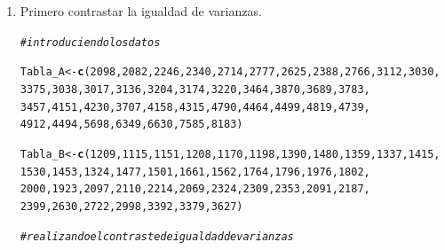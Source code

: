 \documentclass[12pt,letterpaper]{article}\usepackage[]{graphicx}\usepackage[]{color}
\makeatletter
\newcommand{\hlnum}[1]{\textcolor[rgb]{0.686,0.059,0.569}{#1}}%
\newcommand{\hlcom}[1]{\textcolor[rgb]{0.678,0.584,0.686}{\textit{#1}}}%
\newcommand{\hlstd}[1]{\textcolor[rgb]{0.345,0.345,0.345}{#1}}%
\newcommand{\hlkwb}[1]{\textcolor[rgb]{0.69,0.353,0.396}{#1}}%
\newcommand{\hlkwd}[1]{\textcolor[rgb]{0.737,0.353,0.396}{\textbf{#1}}}%
\newenvironment{kframe}{%
 \def\at@end@of@kframe{}%
 \ifinner\ifhmode%
  \def\at@end@of@kframe{\end{minipage}}%
  \begin{minipage}{\columnwidth}%
 \fi\fi%
 \def\FrameCommand##1{\hskip\@totalleftmargin \hskip-\fboxsep
 \colorbox{shadecolor}{##1}\hskip-\fboxsep
     \hskip-\linewidth \hskip-\@totalleftmargin \hskip\columnwidth}%
 \MakeFramed {\advance\hsize-\width
   \@totalleftmargin\z@ \linewidth\hsize
   \@setminipage}}%
 {\par\unskip\endMakeFramed%
 \at@end@of@kframe}
\newenvironment{knitrout}{}{} %
\makeatother
\begin{document}
\begin{enumerate}
  \item Primero contrastar la igualdad de varianzas.

\begin{knitrout}
\color{fgcolor}\begin{kframe}
\begin{alltt}
\hlcom{# introduciendo los datos }

\hlstd{Tabla_A} \hlkwb{<-} \hlkwd{c}\hlstd{(}\hlnum{2098}\hlstd{,} \hlnum{2082}\hlstd{,} \hlnum{2246}\hlstd{,} \hlnum{2340}\hlstd{,} \hlnum{2714}\hlstd{,} \hlnum{2777}\hlstd{,} \hlnum{2625}\hlstd{,} \hlnum{2388}\hlstd{,} \hlnum{2766}\hlstd{,} \hlnum{3112}\hlstd{,} \hlnum{3030}\hlstd{,}
             \hlnum{3375}\hlstd{,} \hlnum{3038}\hlstd{,} \hlnum{3017}\hlstd{,} \hlnum{3136}\hlstd{,} \hlnum{3204}\hlstd{,} \hlnum{3174}\hlstd{,} \hlnum{3220}\hlstd{,} \hlnum{3464}\hlstd{,} \hlnum{3870}\hlstd{,} \hlnum{3689}\hlstd{,} \hlnum{3783}\hlstd{,}
             \hlnum{3457}\hlstd{,} \hlnum{4151}\hlstd{,} \hlnum{4230}\hlstd{,} \hlnum{3707}\hlstd{,} \hlnum{4158}\hlstd{,} \hlnum{4315}\hlstd{,} \hlnum{4790}\hlstd{,} \hlnum{4464}\hlstd{,} \hlnum{4499}\hlstd{,} \hlnum{4819}\hlstd{,} \hlnum{4739}\hlstd{,}
             \hlnum{4912}\hlstd{,} \hlnum{4494}\hlstd{,} \hlnum{5698}\hlstd{,} \hlnum{6349}\hlstd{,} \hlnum{6630}\hlstd{,} \hlnum{7585}\hlstd{,}\hlnum{8183}\hlstd{)}

\hlstd{Tabla_B}\hlkwb{<-} \hlkwd{c}\hlstd{(}\hlnum{1209}\hlstd{,} \hlnum{1115}\hlstd{,} \hlnum{1151}\hlstd{,} \hlnum{1208}\hlstd{,} \hlnum{1170}\hlstd{,} \hlnum{1198}\hlstd{,} \hlnum{1390}\hlstd{,} \hlnum{1480}\hlstd{,} \hlnum{1359}\hlstd{,} \hlnum{1337}\hlstd{,} \hlnum{1415}\hlstd{,}
            \hlnum{1530}\hlstd{,} \hlnum{1453}\hlstd{,} \hlnum{1324}\hlstd{,} \hlnum{1477}\hlstd{,} \hlnum{1501}\hlstd{,} \hlnum{1661}\hlstd{,} \hlnum{1562}\hlstd{,} \hlnum{1764}\hlstd{,} \hlnum{1796}\hlstd{,} \hlnum{1976}\hlstd{,} \hlnum{1802}\hlstd{,}
            \hlnum{2000}\hlstd{,} \hlnum{1923}\hlstd{,} \hlnum{2097}\hlstd{,} \hlnum{2110}\hlstd{,} \hlnum{2214}\hlstd{,} \hlnum{2069}\hlstd{,} \hlnum{2324}\hlstd{,} \hlnum{2309}\hlstd{,} \hlnum{2353}\hlstd{,} \hlnum{2091}\hlstd{,} \hlnum{2187}\hlstd{,}
            \hlnum{2399}\hlstd{,} \hlnum{2630}\hlstd{,} \hlnum{2722}\hlstd{,} \hlnum{2998}\hlstd{,} \hlnum{3392}\hlstd{,} \hlnum{3379}\hlstd{,} \hlnum{3627}\hlstd{)}

\hlcom{# realizando el contraste de igualdad de varianzas}


\end{alltt}
\end{kframe}
\end{knitrout}
\end{enumerate}
\end{document}

